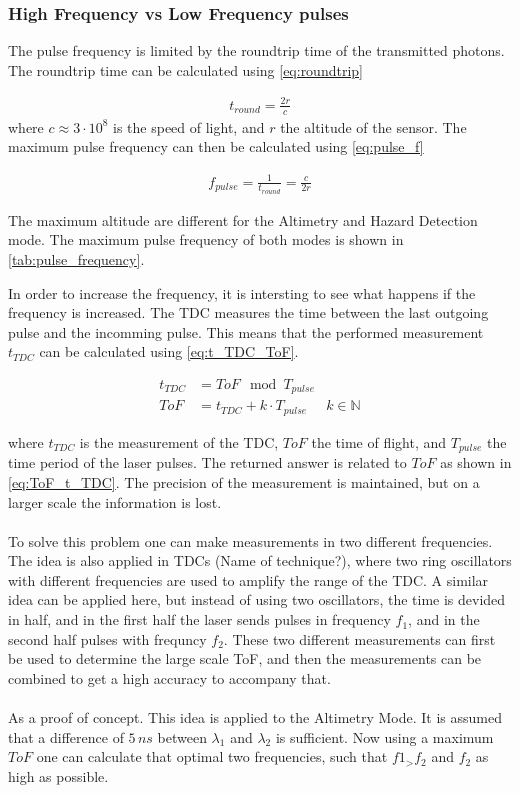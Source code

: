 \subsubsection{High Frequency vs Low Frequency pulses}\label{sssec:high_low_freq}
The pulse frequency is limited by the roundtrip time  of the transmitted photons. The roundtrip time can be calculated using \cref{eq:roundtrip}

\begin{align}\label{eq:roundtrip}
t_{round} = \frac{2r}{c}
\end{align}
where $c\approx 3\cdot10^8$ is the speed of light, and $r$ the altitude of the sensor. The maximum pulse frequency can then be calculated using \cref{eq:pulse_f}

\begin{align}\label{eq:pulse_f}
f_{pulse} = \frac{1}{t_{round}} = \frac{c}{2r}
\end{align}

The maximum altitude are different for the Altimetry and Hazard Detection mode. The maximum pulse frequency of both modes is shown in \cref{tab:pulse_frequency}.



In order to increase the frequency, it is intersting to see what happens if the frequency is increased. The TDC measures the time between the last outgoing pulse and the incomming pulse. This means that the performed measurement $t_{TDC}$ can be calculated using \cref{eq:t_TDC_ToF}.

\begin{align}\label{eq:t_TDC_ToF}
	t_{TDC} &=ToF \mod T_{pulse}\\	
	ToF &= t_{TDC}+k\cdot T_{pulse} & k \in \mathbb{N}\label{eq:ToF_t_TDC}
\end{align}

 where $t_{TDC}$ is the measurement of the TDC, $ToF$ the time of flight, and $T_{pulse}$ the time period of the laser pulses. The returned answer is related to $ToF$ as shown in \cref{eq:ToF_t_TDC}. The precision of the measurement is maintained,  but on a larger scale the information is lost. \\
 \\
To solve this problem one can make measurements in two different frequencies. The idea is also applied in TDCs (Name of technique?), where two ring oscillators with different frequencies are used to amplify the range of the TDC. A similar idea can be applied here, but instead of using two oscillators, the time is devided in half, and in the first half the laser sends pulses in frequency $f_1$, and in the second half pulses with frequncy $f_2$. These two different measurements can first be used to determine the large scale ToF, and then the measurements can be combined to get a high accuracy to accompany that.\\
\\
As a proof of concept. This idea is applied to the Altimetry Mode. It is assumed that a difference of $5\,ns$ between $\lambda_1$ and $\lambda_2$ is sufficient. Now using a maximum $ToF$ one can calculate that optimal two frequencies, such that $f1_>f_2$ and $f_2$ as high as possible. 

